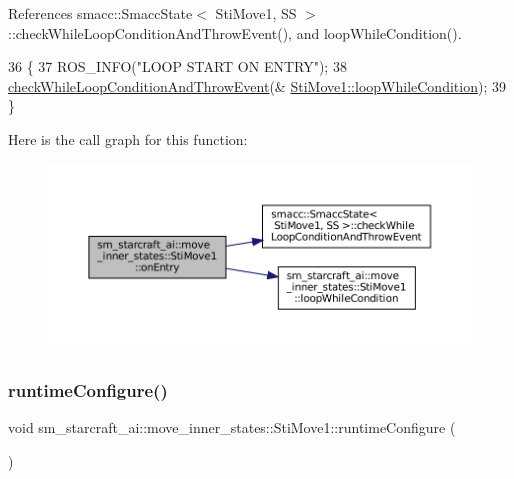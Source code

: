 References smacc\+::\+Smacc\+State$<$ Sti\+Move1, S\+S $>$\+::check\+While\+Loop\+Condition\+And\+Throw\+Event(), and loop\+While\+Condition().


\begin{DoxyCode}
36   \{
37     ROS\_INFO(\textcolor{stringliteral}{"LOOP START ON ENTRY"});
38     \hyperlink{classsmacc_1_1SmaccState_a80082718f226bebedb589f0c4696001d}{checkWhileLoopConditionAndThrowEvent}(&
      \hyperlink{structsm__starcraft__ai_1_1move__inner__states_1_1StiMove1_a04efabda7c4d09fdab6d4c74274cd9d5}{StiMove1::loopWhileCondition});
39   \}
\end{DoxyCode}
Here is the call graph for this function\+:
\nopagebreak
\begin{figure}[H]
\begin{center}
\leavevmode
\includegraphics[width=350pt]{structsm__starcraft__ai_1_1move__inner__states_1_1StiMove1_aed05ed4ebfe0b64d2e585268cdc7bf31_cgraph}
\end{center}
\end{figure}
\mbox{\label{structsm__starcraft__ai_1_1move__inner__states_1_1StiMove1_a0d0fc4260984916f5b9a77d1854560c9}} 
\subsubsection{\texorpdfstring{runtime\+Configure()}{runtimeConfigure()}}
{\footnotesize\ttfamily void sm\+\_\+starcraft\+\_\+ai\+::move\+\_\+inner\+\_\+states\+::\+Sti\+Move1\+::runtime\+Configure (\begin{DoxyParamCaption}{ }\end{DoxyParamCaption})\hspace{0.3cm}{\ttfamily [inline]}}



